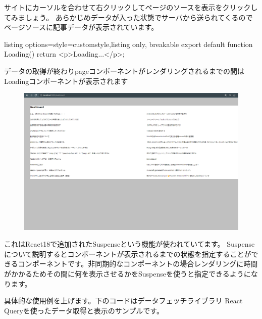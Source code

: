 サイトにカーソルを合わせて右クリックしてページのソースを表示をクリックしてみましょう。
あらかじめデータが入った状態でサーバから送られてくるのでページソースに記事データが表示されています。


\begin{tcblisting}{listing options={style=customstyle},listing only, breakable}
  export default function Loading() {
      return <p>Loading...</p>;
    }
\end{tcblisting}


データの取得が終わりpageコンポーネントがレンダリングされるまでの間はLoadingコンポーネントが表示されます

\begin{figure}[H]
  \centering
  \includegraphics[width=12cm]{./image/03-Tech/chap4/06.png}
\end{figure}




これはReact18で追加されたSuspenseという機能が使われていてます。
Suspenseについて説明するとコンポーネントが表示されるまでの状態を指定することができるコンポーネントです。非同期的なコンポーネントの場合レンダリングに時間がかかるためその間に何を表示させるかをSuspenseを使うと指定できるようになります。

具体的な使用例を上げます。下のコードはデータフェッチライブラリ React Queryを使ったデータ取得と表示のサンプルです。






